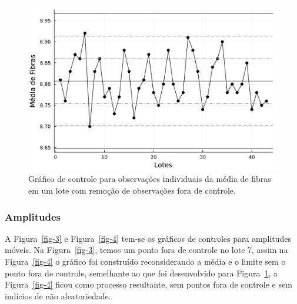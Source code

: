 \documentclass[
  letterpaper,
  DIV=11,
  numbers=noendperiod]{scrartcl}
\begin{document}
\begin{figure}[H]

{\centering \includegraphics{relatorio_files/figure-pdf/fig-2-J1.pdf}

}

\caption{\label{fig-2}Gráfico de controle para observações individuais
da média de fibras em um lote com remoção de observações fora de
controle.}

\end{figure}

\hypertarget{amplitudes}{%
\subsubsection{Amplitudes}\label{amplitudes}}

A Figura~\ref{fig-3} e Figura~\ref{fig-4} tem-se os gráficos de
controles para amplitudes móveis. Na Figura~\ref{fig-3}, temos um ponto
fora de controle no lote 7, assim na Figura~\ref{fig-4} o gráfico foi
construído reconsiderando a média e o limite sem o ponto fora de
controle, semelhante ao que foi desenvolvido para Figura~\ref{fig-2}, a
Figura~\ref{fig-4} ficou como processo resultante, sem pontos fora de
controle e sem indícios de não aleatoriedade.
\end{document}
